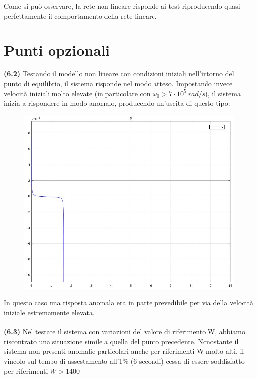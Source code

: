 \documentclass[a4paper,12pt,italian]{article}
\begin{document}
Come si può osservare, la rete non lineare risponde ai test riproducendo quasi perfettamente il comportamento della rete lineare.

\newpage

\section{Punti opzionali}

\textbf{(6.2)} Testando il modello non lineare con condizioni iniziali nell'intorno del punto di equilibrio, il sistema risponde nel modo atteso.
Impostando invece velocità iniziali molto elevate (in particolare con ${\omega_0 >7\cdot10^5~rad/s}$), il sistema inizia a rispondere in modo anomalo,
producendo un'uscita di questo tipo:

\begin{figure}[h!]
    \begin{center}
        \includegraphics[scale=0.35]{img/risposta_omega_iniz_elevato.jpg}
    \end{center}
\end{figure}
In questo caso una risposta anomala era in parte prevedibile per via della velocità iniziale estremamente elevata.\\ \\
\textbf{(6.3)}
Nel testare il sistema con variazioni del valore di riferimento W, abbiamo riscontrato una situazione simile a quella del punto precedente.
Nonostante il sistema non presenti anomalie particolari anche per riferimenti W molto alti, il vincolo sul tempo di assestamento all'1\% (6 secondi) cessa di essere soddisfatto per riferimenti $W > 1400$
\end{document}
